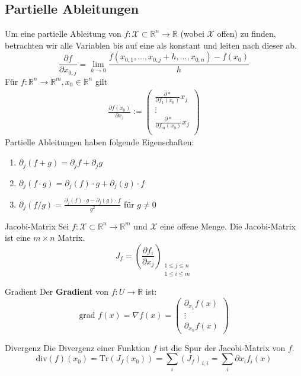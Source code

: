 \documentclass[a4paper,10pt]{article}
\newcommand{\pdv}[2]{\frac{\partial #1}{\partial #2}}
\def\R{\mathbb{R}}
\def\X{\mathcal{X}}
\begin{document}
\subsection{Partielle Ableitungen}
Um eine partielle Ableitung von $f: \X \subset \R^n \to \R$ (wobei $\X$ offen) zu finden, betrachten wir alle Variablen bis auf eine als konstant und leiten nach dieser ab.
$$\pdv{f}{x_{0,j}} = \lim_{h \to 0} \frac{f(x_{0,1}, \ldots, x_{0,j} + h, \ldots, x_{0,n}) - f(x_0)}{h}$$
Für $f: \R^n \to \R^m, x_0 \in \R^n$ gilt
\begin{align*}
    \pdv{f(x_0)}{x_j} := \begin{pmatrix} 
    \pdv*{f_1(x_0)}{x_j}                 \\
    \vdots                               \\
    \pdv*{f_m(x_0)}{x_j}                 \\
    \end{pmatrix}                        
\end{align*}
Partielle Ableitungen haben folgende Eigenschaften:
\begin{enumerate}
    \item $\partial_j(f + g) = \partial_j f + \partial_j g$
    \item $\partial_j(f \cdot g) = \partial_j (f) \cdot g + \partial_j (g) \cdot f$
    \item $\partial_j(f / g) = \frac{\partial_j (f) \cdot g - \partial_j (g) \cdot f}{g^2}$ für $g \ne 0$
\end{enumerate}
\begin{mainbox}{Jacobi-Matrix}
    Sei $f: \X \subset \R^n \to \R^m$ und $\X$ eine offene Menge. Die Jacobi-Matrix ist eine $m\times n$ Matrix.
    $$J_f = \left( \pdv{f_i}{x_j} \right)_{\substack{1 \leq j \leq n \\ 1 \leq i \leq m}}$$
\end{mainbox}
\begin{mainbox}{Gradient}
    Der \textbf{Gradient} von $f:U\to \mathbb{R}$ ist:
 $$\text{grad } f(x) = \nabla f(x)= \left(\begin{array}{c}
\partial_{x_1} f\left(x\right) \\
\vdots \\
\partial_{x_n} f\left(x\right)
\end{array}\right)$$
\end{mainbox}
\begin{subbox}{Divergenz}
    Die Divergenz einer Funktion $f$ ist die Spur der Jacobi-Matrix von $f$. $$\text{div}(f)(x_0) = \text{Tr}(J_f(x_0)) = \sum_{i}(J_f)_{i,i} =\sum_{i}\partial x_{i}f_{i}(x)$$
\end{subbox}
\end{document}
